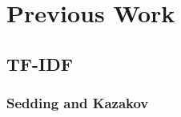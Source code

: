 \documentclass[twocolumn]{article}
\begin{document}
\section{Previous Work}
\label{sec:PreviousWork}
\subsection{TF-IDF}
\label{sec:TFIDF}

\subsubsection{Sedding and Kazakov}
\label{sec:SeddingKazakov}
\end{document}
